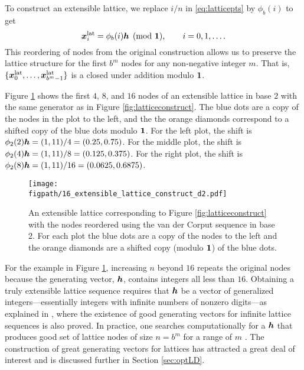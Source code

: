 \documentclass{svproc}
\newcommand{\figpath}{Figures}
\begin{document}
To construct an extensible lattice, we replace $i/n$ in \eqref{eq:latticepts} by $\phi_b(i)$ to get
\begin{equation} \label{eq:extensiblelattice}
	{\boldsymbol{x}}_i^{\text{lat}} =\phi_b( i){\boldsymbol{h}} \pmod {{\boldsymbol{1}}}, \qquad i = 0, 1 , \ldots .
\end{equation}
This reordering of nodes from the original construction allows us to preserve the lattice structure for the first $b^m$ nodes for any non-negative integer $m$. That is, $\{{\boldsymbol{x}}^{\text{lat}}_0, \ldots, {\boldsymbol{x}}^{\text{lat}}_{b^m-1}\}$ is a closed under addition modulo ${\boldsymbol{1}}$.

Figure \ref{fig:extensiblelatticeconstruct} shows the first $4$, $8$, and $16$ nodes of an extensible lattice in base $2$ with the same generator as in Figure \ref{fig:latticeconstruct}.  The blue dots are a copy of the nodes in the plot to the left, and the the orange diamonds correspond to a shifted copy of the blue dots modulo ${\boldsymbol{1}}$.  For the left plot, the shift is $\phi_2(2){\boldsymbol{h}} = (1,11)/4=(0.25,0.75)$.  For the middle plot, the shift is $\phi_2(4){\boldsymbol{h}} = (1,11)/8=(0.125,0.375)$. For the right plot, the shift is $\phi_2(8){\boldsymbol{h}} = (1,11)/16=(0.0625,0.6875)$.

\begin{figure}
	\centering
	\texttt{[image: \\figpath/16\_extensible\_lattice\_construct\_d2.pdf]}
	\caption{An extensible lattice corresponding to  Figure \ref{fig:latticeconstruct}  with the nodes reordered using the van der Corput sequence in base $2$.  For each plot the blue dots are a copy of the nodes to the left and the orange diamonds are a shifted copy (modulo ${\boldsymbol{1}}$) of the blue dots. \label{fig:extensiblelatticeconstruct}}
\end{figure}

For the example in Figure \ref{fig:extensiblelatticeconstruct}, increasing $n$ beyond $16$ repeats the original nodes because the generating vector, ${\boldsymbol{h}}$, contains integers all less than $16$.  Obtaining a truly extensible lattice sequence requires that ${\boldsymbol{h}}$ be a vector of generalized integers---essentially integers with infinite numbers of nonzero digits---as explained in \cite{HicNie03a}, where the existence of good generating vectors for infinite lattice sequences is also proved.  In practice, one searches computationally for a ${\boldsymbol{h}}$ that produces good set of lattice nodes of size $n = b^m$ for a range of $m$ \cite{HicEtal00}. The construction of great generating vectors for lattices has attracted a great deal of interest and is discussed further in Section \ref{sec:optLD}. 
\end{document}
